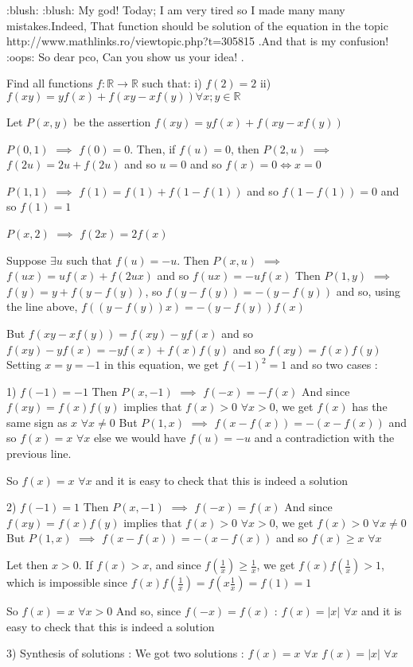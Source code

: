 \begin{solution}
	:blush:  :blush:  
My god! Today; I am very tired so I made many many mistakes.Indeed, That function should be solution of the equation in the topic  http://www.mathlinks.ro/viewtopic.php?t=305815 .And that is my confusion! :oops: 
So dear pco, Can you show us your idea!
.
\end{solution}



\begin{solution}
	\begin{tcolorbox}Find all functions  $ f: \mathbb R \to \mathbb R$ such that: 
i) $ f(2) = 2$
ii) $ f(xy) = yf(x) + f(xy - xf(y)) \forall x;y \in \mathbb R$\end{tcolorbox}

Let $ P(x,y)$ be the assertion $ f(xy)=yf(x)+f(xy-xf(y))$

$ P(0,1)$ $ \implies$ $ f(0)=0$. Then, if $ f(u)=0$, then $ P(2,u)$ $ \implies$ $ f(2u)=2u+f(2u)$ and so $ u=0$ and so $ \boxed{f(x)=0\iff x=0}$

$ P(1,1)$ $ \implies$ $ f(1)=f(1)+f(1-f(1))$ and so $ f(1-f(1))=0$ and so $ \boxed{f(1)=1}$

$ P(x,2)$ $ \implies$ $ f(2x)=2f(x)$

Suppose $ \exists u$ such that $ f(u)=-u$. Then $ P(x,u)$ $ \implies$ $ f(ux)=uf(x)+f(2ux)$ and so $ f(ux)=-uf(x)$
Then $ P(1,y)$ $ \implies$ $ f(y)=y+f(y-f(y))$, so $ f(y-f(y))=-(y-f(y))$ and so, using the line above, $ f((y-f(y))x)=-(y-f(y))f(x)$

But $ f(xy-xf(y))=f(xy)-yf(x)$ and so $ f(xy)-yf(x)=-yf(x)+f(x)f(y)$ and so $ \boxed{f(xy)=f(x)f(y)}$
Setting $ x=y=-1$ in this equation, we get $ f(-1)^2=1$ and so two cases :

1) $ f(-1)=-1$
Then $ P(x,-1)$ $ \implies$ $ f(-x)=-f(x)$
And since $ f(xy)=f(x)f(y)$ implies that $ f(x)>0$ $ \forall x>0$, we get $ f(x)$ has the same sign as $ x$ $ \forall x\neq 0$
But $ P(1,x)$ $ \implies$ $ f(x-f(x))=-(x-f(x))$ and so $ f(x)=x$ $ \forall x$ else we would have $ f(u)=-u$ and a contradiction with the previous line.

So $ f(x)=x$ $ \forall x$ and it is easy to check that this is indeed a solution

2) $ f(-1)=1$
Then $ P(x,-1)$ $ \implies$ $ f(-x)=f(x)$
And since $ f(xy)=f(x)f(y)$ implies that $ f(x)>0$ $ \forall x>0$, we get $ f(x)>0$ $ \forall x\neq 0$
But $ P(1,x)$ $ \implies$ $ f(x-f(x))=-(x-f(x))$ and so $ f(x)\geq x$ $ \forall x$

Let then $ x>0$. If $ f(x)>x$, and since $ f(\frac 1x)\geq \frac 1x$, we get $ f(x)f(\frac 1x)>1$, which is impossible since $ f(x)f(\frac 1x)=f(x\frac 1x)=f(1)=1$

So $ f(x)=x$ $ \forall x>0$
And so, since $ f(-x)=f(x)$ :  $ f(x)=|x|$ $ \forall x$ and it is easy to check that this is indeed a solution

3) Synthesis of solutions :
We got two solutions :
$ f(x)=x$ $ \forall x$
$ f(x)=|x|$ $ \forall x$
\end{solution}



